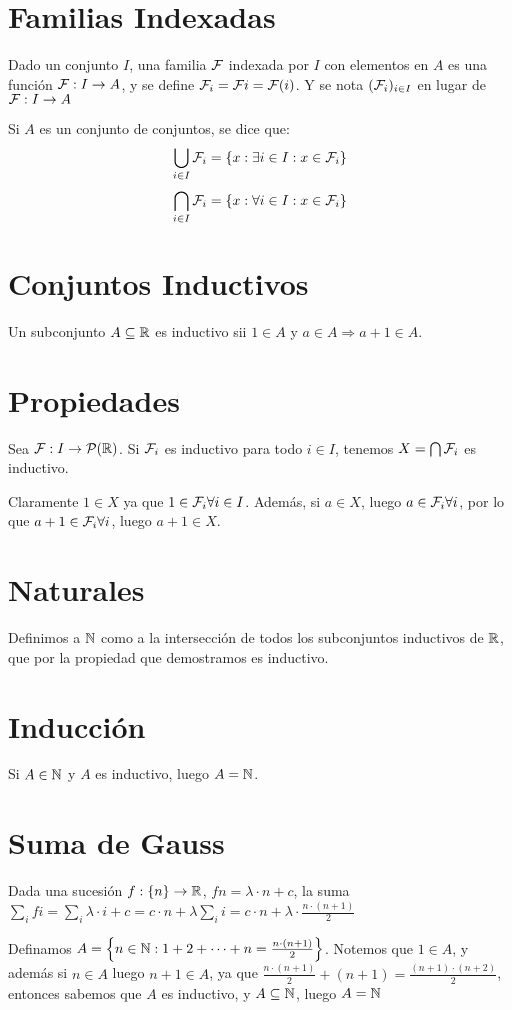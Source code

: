 \documentclass{article}
\begin{document}
\section{Familias Indexadas}
Dado un conjunto $I$, una familia $\mathcal{F}$ indexada por $I$ con elementos en $A$ es una
función $\mathcal{F} : I \to A$, y se define $\mathcal{F}_i = \mathcal{F} i = \mathcal{F}(i)$. Y se nota
$(\mathcal{F}_i)_{i \in I}$ en lugar de $\mathcal{F} : I \to A$

Si $A$ es un conjunto de conjuntos, se dice que:
\[\bigcup_{i \in I} \mathcal{F}_i = \{x : \exists i \in I : x \in \mathcal{F}_i\}\]
\[\bigcap_{i \in I} \mathcal{F}_i = \{x : \forall i \in I : x \in \mathcal{F}_i\}\]

\section{Conjuntos Inductivos}
Un subconjunto $A \subseteq \mathbb{R}$ es inductivo sii $1 \in A$ y $a \in A \Rightarrow a+1 \in A$.

\section{Propiedades}
Sea $\mathcal{F} : I \to \mathcal{P}(\mathbb{R})$. Si $\mathcal{F}_i$ es inductivo para todo $i \in I$, tenemos
$X = \bigcap \mathcal{F}_i$ es inductivo.

Claramente $1 \in X$ ya que $1 \in \mathcal{F}_i \forall i \in I$. Además, si $a \in X$,
luego $a\in \mathcal{F}_i \forall i$, por lo que $a+1 \in \mathcal{F}_i \forall i$, luego $a+1 \in X$.

\section{Naturales}
Definimos a $\mathbb{N}$ como a la intersección de todos los subconjuntos inductivos de $\mathbb{R}$,
que por la propiedad que demostramos es inductivo.

\section{Inducción}
Si $A \in \mathbb{N}$ y $A$ es inductivo, luego $A = \mathbb{N}$.

\section{Suma de Gauss}
Dada una sucesión $f : \{n\} \to \mathbb{R}$, $f n = \lambda \cdot n + c$, la suma
$\sum_i fi = \sum_i \lambda \cdot i + c = c \cdot n + \lambda \sum_i i = c
\cdot n + \lambda \cdot \frac{n \cdot (n+1)}{2}$

Definamos $A = \left\{n \in \mathbb{N} : 1 + 2 + \dots + n = \frac{n \cdot (n+1)}{2} \right\}$.
Notemos que $1 \in A$, y además si $n \in A$ luego $n + 1 \in A$, ya que
$\frac{n \cdot (n+1)}{2} + (n+1) = \frac{(n+1) \cdot (n+2)}{2} $, entonces sabemos que
$A$ es inductivo, y $A \subseteq \mathbb{N}$, luego $A = \mathbb{N}$
\end{document}
